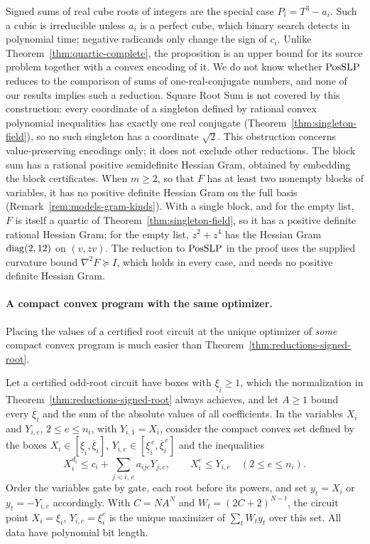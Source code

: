 Signed sums of real cube roots of integers are the special case
$P_i=T^3-a_i$. Such a cubic is irreducible unless $a_i$ is a perfect cube,
which binary search detects in polynomial time; negative radicands only change
the sign of $c_i$. Unlike Theorem~\ref{thm:quartic-complete}, the proposition is
an upper bound for its source problem together with a convex encoding of it.
We do not know whether $\mathrm{PosSLP}$ reduces to the comparison of sums of
one-real-conjugate numbers, and none of our results implies such a reduction.
Square Root Sum is not covered by this construction: every coordinate of a
singleton defined by rational convex polynomial inequalities has exactly one
real conjugate (Theorem~\ref{thm:singleton-field}), so no such singleton has a
coordinate $\sqrt2$. This obstruction concerns value-preserving encodings only;
it does not exclude other reductions. The block sum has a rational positive
semidefinite Hessian Gram, obtained by embedding the block certificates. When
$m\ge2$, so that $F$ has at least two nonempty blocks of variables, it has no
positive definite Hessian Gram on the full basis
(Remark~\ref{rem:models-gram-kinds}). With a single block, and for the empty
list, $F$ is itself a quartic of Theorem~\ref{thm:singleton-field}, so it has
a positive definite rational Hessian Gram; for the empty list, $z^2+z^4$ has
the Hessian Gram $\operatorname{diag}(2,12)$ on $(v,zv)$. The reduction to $\mathrm{PosSLP}$ in
the proof uses the supplied curvature bound $\nabla^2F\succeq I$, which holds
in every case, and needs no positive definite Hessian Gram.

\paragraph{A compact convex program with the same optimizer.}
Placing the values of a certified root circuit at the unique optimizer of
\emph{some} compact convex program is much easier than
Theorem~\ref{thm:reductions-signed-root}.

\begin{proposition}
\label{prop:reductions-box-baseline}
Let a certified odd-root circuit have boxes with $\underline\xi_i\ge1$, which
the normalization in Theorem~\ref{thm:reductions-signed-root} always achieves,
and let $A\ge1$ bound every $\overline\xi_i$ and the sum of the absolute values
of all coefficients. In the variables $X_i$ and $Y_{i,e}$, $2\le e\le n_i$, with
$Y_{i,1}=X_i$, consider the compact convex set defined by the boxes
$X_i\in[\underline\xi_i,\overline\xi_i]$,
$Y_{i,e}\in[\underline\xi_i^{\,e},\overline\xi_i^{\,e}]$ and the inequalities
\[
 X_i^{d_i}\le c_i+\sum_{j<i,\,e}a_{ije}Y_{j,e},\qquad X_i^e\le Y_{i,e}
 \quad(2\le e\le n_i).
\]
Order the variables gate by gate, each root before its powers, and set
$y_t=X_i$ or $y_t=-Y_{i,e}$ accordingly. With $C=NA^N$ and
$W_t=(2C+2)^{N-t}$, the circuit point $X_i=\xi_i$, $Y_{i,e}=\xi_i^e$ is the
unique maximizer of $\sum_tW_ty_t$ over this set. All data have polynomial bit
length.
\end{proposition}

